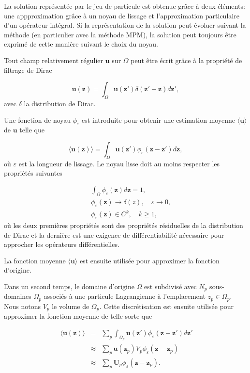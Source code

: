 La solution représentée par le jeu de particule est obtenue grâce à deux éléments: une appproximation grâce à un noyau de lissage et l'approximation particulaire d'un opérateur intégral. Si la représentation de la solution peut évoluer suivant la méthode (en particulier avec la méthode MPM), la solution peut toujours être exprimé de cette manière suivant le choix du noyau.

Tout champ relativement régulier $\bm{u}$ sur $\Omega$ peut être écrit grâce à la propriété de filtrage de Dirac

\begin{equation*}
    \bm{u}(\bm{z}) = \int_{\Omega} \bm{u}(\bm{z'}) \delta(\bm{z'} - \bm{z})  d\bm{z'},
\end{equation*}avec $\delta$ la distribution de Dirac.

Une fonction de noyau $\phi_\varepsilon$ est introduite pour obtenir une estimation moyenne $\langle \bm{u} \rangle$ de $\bm{u}$ telle que

\begin{equation*}
    \langle \bm{u}(\bm{z}) \rangle = \int_{\Omega} \bm{u}(\bm{z'}) \phi_\varepsilon(\bm{z}-\bm{z'}) d\bm{z},
\end{equation*}où $\varepsilon$ est la longueur de lissage. Le noyau lisse doit au moins respecter les propriétés suivantes

\begin{eqnarray*}
    && \int_{\Omega} \phi_\varepsilon(\bm{z}) d\bm{z} = 1,      \\
    && \phi_\varepsilon(\bm{z}) \to \delta(z), \quad \varepsilon \to 0, \\
    && \phi_\varepsilon(\bm{z}) \in C^k,  \quad k \geq 1,
\end{eqnarray*} où les deux premières propriétés sont des propriétés résiduelles de la distribution de Dirac et la dernière est une exigence de différentiabilité nécessaire pour approcher les opérateurs différentielles.

La fonction moyenne $\langle \bm{u} \rangle$ est ensuite utilisée pour approximer la fonction d'origine.

Dans un second temps, le domaine d'origine $\Omega$ est subdivisé avec $N_p$ sous-domaines $\Omega_p$ associés à une particule Lagrangienne à l'emplacement $z_p \in \Omega_p$. Nous notons $V_p$ le volume de $\Omega_p$. Cette discrétisation est ensuite utilisée pour approximer la fonction moyenne de telle sorte que

\begin{eqnarray*}~\label{eq:part_approx}
    \langle \bm{u}(\bm{z}) \rangle &=& \sum_p \int_{\Omega_p} \bm{u}(\bm{z'}) \phi_\varepsilon(\bm{z}-\bm{z'}) d\bm{z'} \\
    &\approx& \sum_p \bm{u}(\bm{z}_p) V_p \phi_\varepsilon (\bm{z}-\bm{z}_p) \\
    &\approx& \sum_p \bm{U}_p \phi_\varepsilon (\bm{z}-\bm{z}_p).
\end{eqnarray*}

